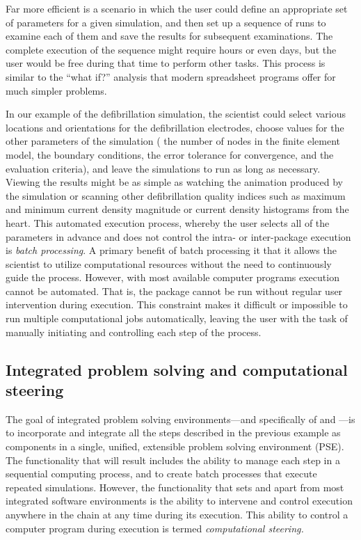 Far more efficient is a scenario in which the user could define an
appropriate set of parameters for a given simulation, and then set up
a sequence of runs to examine each of them and save the results for
subsequent examinations.  The complete execution of the sequence might
require hours or even days, but the user would be free during that
time to perform other tasks.  This process is similar to the ``what
if?'' analysis that modern spreadsheet programs offer for much simpler
problems.  

In our example of the defibrillation simulation, the scientist could select
various locations and orientations for the defibrillation electrodes,
choose values for the other parameters of the simulation (\eg{} the number
of nodes in the finite element model, the boundary conditions, the error
tolerance for convergence, and the evaluation criteria), and leave the
simulations to run as long as necessary.  Viewing the results might be as
simple as watching the animation produced by the simulation or scanning
other defibrillation quality indices such as maximum and minimum current
density magnitude or current density histograms from the heart.  This
automated execution process, whereby the user selects all of the parameters
in advance and does not control the intra- or inter-package execution is
\emph{batch processing}.  A primary benefit of batch processing it that it
allows the scientist to utilize computational resources without the need to
continuously guide the process.  However, with most available computer
programs execution cannot be automated.  That is, the package cannot be run
without regular user intervention during execution.  This constraint makes
it difficult or impossible to run multiple computational jobs
automatically, leaving the user with the task of manually initiating and
controlling each step of the process.

\subsection{Integrated problem solving and computational
steering} 
\label{sec:con-steering} 

The goal of integrated problem solving environments---and specifically of
\SR{} and \PSE{}---is to incorporate and integrate all the steps described
in the previous example as components in a single, unified, extensible
problem solving environment (PSE).  The functionality that will
result includes the ability to manage each step in a sequential computing
process, and to create batch processes that execute repeated simulations.
However, the functionality that sets \SR{} and \PSE{} apart from most
integrated software environments is the ability to intervene and control
execution anywhere in the chain at any time during its execution.  This
ability to control a computer program during execution is termed
\emph{computational steering.}

